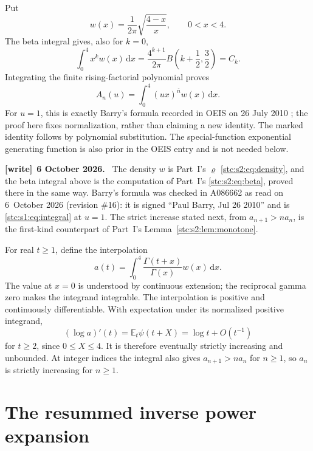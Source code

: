 \documentclass[11pt,letterpaper]{article}
\numberwithin{equation}{section}
\theoremstyle{remark}\newtheorem{remark}[theorem]{Remark}
\newcommand{\E}{\mathbb E}
\newcommand{\dd}{\,\mathrm d}
\newcommand{\rf}[2]{#1^{\overline{#2}}}
\newcommand{\Ga}{\Gamma}
\newenvironment{writenote}[1][]{\par\smallskip\begingroup\small
 \noindent\textbf{[write]}\if\relax\detokenize{#1}\relax\else~\textbf{#1.}\fi\ }%
 {\par\endgroup\smallskip}
\begin{document}
Put
\[
 w(x)=\frac1{2\pi}\sqrt{\frac{4-x}{x}},\qquad 0<x<4.
\]
The beta integral gives, also for $k=0$,
\[
 \int_0^4 x^k w(x)\dd x
 =\frac{4^{k+1}}{2\pi}B\left(k+\frac12,\frac32\right)=C_k.
\]
Integrating the finite rising-factorial polynomial proves
\begin{equation}\label{stc:s1:eq:integral}
 A_n(u)=\int_0^4\rf{(ux)}{n}w(x)\dd x.
\end{equation}
For $u=1$, this is exactly Barry's formula recorded in OEIS on 26 July 2010 \cite{oeisA086662}; the proof here fixes normalization, rather than claiming a new identity. The marked identity follows by polynomial substitution. The special-function exponential generating function is also prior in the OEIS entry and is not needed below.

\begin{writenote}[6 October 2026]
The density $w$ is Part~I's $\varrho$ \eqref{stc:s2:eq:density}, and the beta integral above is the computation of Part~I's \eqref{stc:s2:eq:beta}, proved there in the same way. Barry's formula was checked in A086662 as read on 6~October 2026 (revision \#16): it is signed ``Paul Barry, Jul 26 2010'' and is \eqref{stc:s1:eq:integral} at $u=1$. The strict increase stated next, from $a_{n+1}>na_n$, is the first-kind counterpart of Part~I's Lemma~\ref{stc:s2:lem:monotone}.
\end{writenote}

For real $t\geq1$, define the interpolation
\begin{equation}\label{stc:s1:eq:real}
 a(t)=\int_0^4\frac{\Ga(t+x)}{\Ga(x)}w(x)\dd x.
\end{equation}
The value at $x=0$ is understood by continuous extension; the reciprocal gamma zero makes the integrand integrable. The interpolation is positive and continuously differentiable. With expectation under its normalized positive integrand,
\begin{equation}\label{stc:s1:eq:derivative}
 (\log a)'(t)=\E_t\psi(t+X)=\log t+O(t^{-1})
\end{equation}
for $t\geq2$, since $0\leq X\leq4$. It is therefore eventually strictly increasing and unbounded. At integer indices the integral also gives $a_{n+1}>n a_n$ for $n\geq1$, so $a_n$ is strictly increasing for $n\geq1$.

\section{The resummed inverse power expansion}\label{stc:s1:sec:resummed}
\end{document}
